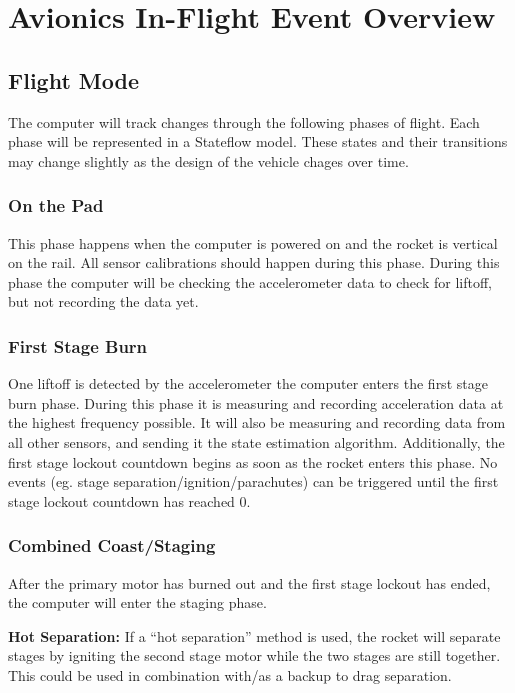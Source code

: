 \section{Avionics In-Flight Event Overview} \label{section:avionics-appendix}

\subsection*{Flight Mode}
The computer will track changes through the following phases of flight. Each phase will be represented in a Stateflow model. These states and their transitions may change slightly as the design of the vehicle chages over time.

\subsubsection*{On the Pad}
This phase happens when the computer is powered on and the rocket is vertical on the rail. All sensor calibrations should happen during this phase. During this phase the computer will be checking the accelerometer data to check for liftoff, but not recording the data yet. 

\subsubsection*{First Stage Burn}
One liftoff is detected by the accelerometer the computer enters the first stage burn phase. During this phase it is measuring and recording acceleration data at the highest frequency possible. It will also be measuring and recording data from all other sensors, and sending it the state estimation algorithm. Additionally, the first stage lockout countdown begins as soon as the rocket enters this phase. No events (eg. stage separation/ignition/parachutes) can be triggered until the first stage lockout countdown has reached 0. 

\subsubsection*{Combined Coast/Staging}
After the primary motor has burned out and the first stage lockout has ended, the computer will enter the staging phase. 

\noindent\textbf{Hot Separation:} If a ``hot separation'' method is used, the rocket will separate stages by igniting the second stage motor while the two stages are still together. This could be used in combination with/as a backup to drag separation. 

